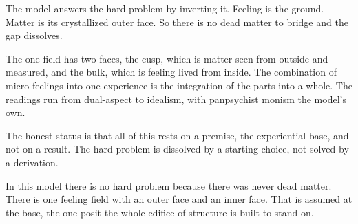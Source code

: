 The model answers the hard problem by inverting it. Feeling is the ground. Matter is its crystallized outer face. So there is no dead matter to bridge and the gap dissolves.

The one field has two faces, the cusp, which is matter seen from outside and measured, and the bulk, which is feeling lived from inside. The combination of micro-feelings into one experience is the integration of the parts into a whole. The readings run from dual-aspect to idealism, with panpsychist monism the model's own.

The honest status is that all of this rests on a premise, the experiential base, and not on a result. The hard problem is dissolved by a starting choice, not solved by a derivation.

\begin{result}
In this model there is no hard problem because there was never dead matter. There is one feeling field with an outer face and an inner face. That is assumed at the base, the one posit the whole edifice of structure is built to stand on.
\end{result}
